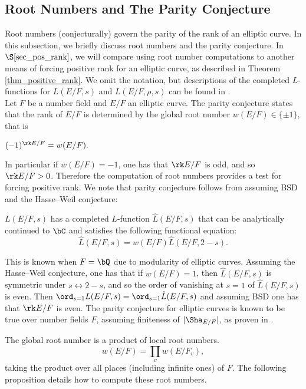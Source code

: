 \subsection{Root Numbers and The Parity Conjecture}

Root numbers (conjecturally) govern the parity of the rank of an elliptic curve. In this subsection, we briefly discuss root numbers and the parity conjecture. In $\S\ref{sec_pos_rank}$, we will compare using root number computations to another means of forcing positive rank for an elliptic curve, as described in Theorem \ref{thm_positive_rank}. We omit the notation, but descriptions of the completed $L$-functions for $L(E / F, s)$ and $L(E / F, \rho, s)$ can be found in \cite[$\S$2.5]{DEW1}.\\


Let $F$ be a number field and $E / F$ an elliptic curve. The parity conjecture states that the rank of $E / F$ is determined by the global root number $w(E / F) \in \{ \pm 1 \}$, that is

\begin{conj}\label{parity}
    $(-1)^{\rk E / F} = w(E / F).$
\end{conj}

In particular if $w(E / F) = -1$, one has that $\rk E / F$ is odd, and so $\rk E / F > 0$. Therefore the computation of root numbers provides a test for forcing positive rank. We note that parity conjecture follows from assuming BSD and the Hasse--Weil conjecture: 

\begin{conj}
    $L(E / F, s)$ has a completed $L$-function 
    $\hat{L}(E / F, s)$ that can be analytically continued to $\bC$ and satisfies the following functional equation:
    \[ \hat{L}(E / F, s) = w(E / F) \hat{L}(E / F, 2- s) .\]
\end{conj}

This is known when $F = \bQ$ due to modularity of elliptic curves. Assuming the Hasse--Weil conjecture, one has that if $w(E / F) = 1$, then $\hat{L}(E / F, s)$ is symmetric under $s \leftrightarrow 2 - s$, and so the order of vanishing at $s = 1$ of $\hat{L}(E / F, s)$ is even. Then $\ord_{s = 1} L(E / F, s) = \ord_{s = 1}\hat{L}(E / F, s)$ and assuming BSD one has that $\rk E / F$ is even. 
The parity conjecture for elliptic curves is known to be true over number fields $F$, assuming finiteness of $|\Sha_{E / F}|$, as proven in \cite{TimVlad}.

The global root number is a product of local root numbers. 
\[ w(E / F) = \prod_v w(E / F_v), \]
taking the product over all places (including infinite ones) of $F$. 
The following proposition details how to compute these root numbers. 

